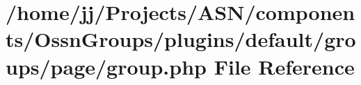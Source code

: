 \hypertarget{_ossn_groups_2plugins_2default_2groups_2page_2group_8php}{}\section{/home/jj/\+Projects/\+A\+S\+N/components/\+Ossn\+Groups/plugins/default/groups/page/group.php File Reference}
\label{_ossn_groups_2plugins_2default_2groups_2page_2group_8php}
